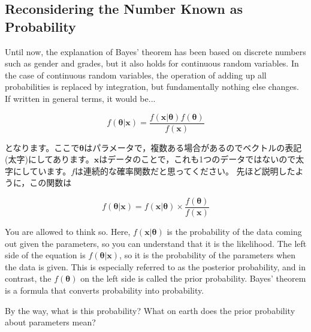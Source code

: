 \documentclass{ltjsbook}
\begin{document}
\subsection{Reconsidering the Number Known as Probability}
Until now, the explanation of Bayes' theorem has been based on discrete numbers such as gender and grades, but it also holds for continuous random variables. In the case of continuous random variables, the operation of adding up all probabilities is replaced by integration, but fundamentally nothing else changes. If written in general terms, it would be...

\[ f(\bm{\theta}|\bm{x}) = \frac{f(\bm{x}|\bm{\theta})f(\bm{\theta})}{f(\bm{x})} \]

となります。ここで$\bm{\theta}$はパラメータで，複数ある場合があるのでベクトルの表記(太字)にしてあります。$\bm{x}$はデータのことで，これも1つのデータではないので太字にしています。$f$は連続的な確率関数だと思ってください。
先ほど説明したように，この関数は

\[ f(\bm{\theta}|\bm{x}) = f(\bm{x}|\bm{\theta}) \times \frac{f(\bm{\theta})}{f(\bm{x})} \]

You are allowed to think so. Here, $f(\bm{x}|\bm{\theta})$ is the probability of the data coming out given the parameters, so you can understand that it is the likelihood. The left side of the equation is $ f(\bm{\theta}|\bm{x})$, so it is the probability of the parameters when the data is given. This is especially referred to as the posterior probability, and in contrast, the $f(\bm{\theta})$ on the left side is called the prior probability.
Bayes' theorem is a formula that converts probability into probability.

By the way, what is this probability? What on earth does the prior probability about parameters mean?
\end{document}
